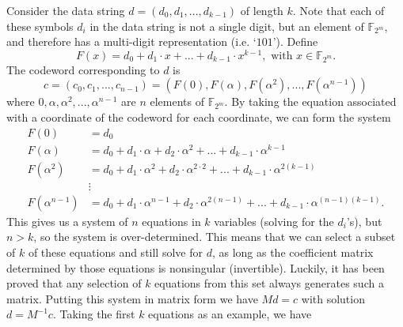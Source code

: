 \documentclass[11pt]{article}
\newcommand{\F}{\mathbb{F}}
\begin{document}
Consider the data string $d=(d_{0},d_{1},...,d_{k-1})$ of length $k$. Note that each of these symbols $d_{i}$ in the data string is not a single digit, but an element of $\F_{2^{m}}$, and therefore has a multi-digit representation (i.e. `$101$'). Define
\[F(x)=d_{0}+d_{1}\cdot x+...+d_{k-1}\cdot x^{k-1},\text{ with } x \in \F_{2^{m}}.\]
The codeword corresponding to $d$ is \[c=(c_{0},c_{1},...,c_{n-1})=(F(0),F(\alpha),F(\alpha^{2}),...,F(\alpha^{n-1}))\]
where $0,\alpha,\alpha^{2},...,\alpha^{n-1}$ are $n$ elements of $\F_{2^{m}}$. By taking the equation associated with a coordinate of the codeword for each coordinate, we can form the system
\begin{align*}
F(0) &= d_{0}\\
F(\alpha) &= d_{0} + d_{1}\cdot\alpha + d_{2}\cdot\alpha^{2} + ... + d_{k-1}\cdot\alpha^{k-1}\\
F(\alpha^{2}) &= d_{0} + d_{1}\cdot\alpha^{2} + d_{2}\cdot\alpha^{2\cdot2} + ... + d_{k-1}\cdot\alpha^{2(k-1)}\\
&\vdots\\
F(\alpha^{n-1}) &= d_{0} + d_{1}\cdot\alpha^{n-1} + d_{2}\cdot\alpha^{2(n-1)} + ... + d_{k-1}\cdot\alpha^{(n-1)(k-1)}.
\end{align*}
This gives us a system of $n$ equations in $k$ variables (solving for the $d_{i}$'s), but $n>k$, so the system is over-determined. This means that we can select a subset of $k$ of these equations and still solve for $d$, as long as the coefficient matrix determined by those equations is nonsingular (invertible). Luckily, it has been proved that any selection of $k$ equations from this set always generates such a matrix. Putting this system in matrix form we have $Md=c$ with solution $d=M^{-1}c$. Taking the first $k$ equations as an example, we have
\end{document}
